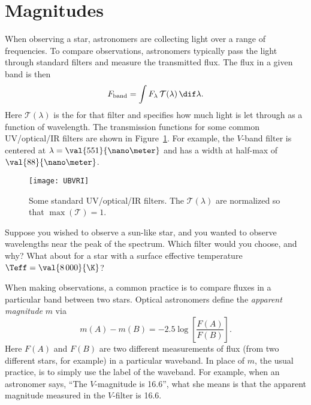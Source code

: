 \section{Magnitudes}
\label{s.magnitudes}

When observing a star, astronomers are collecting light over a range of frequencies. To compare observations, astronomers typically pass the light through standard filters and measure the transmitted flux. The flux in a given band is then
\[
	F_{\mathrm{band}} = \int F_{\lambda} \, \mathcal{T}(\lambda)\,\dif\lambda.
\]
Here $\mathcal{T}(\lambda)$ is the  for that filter and specifies how much light is let through as a function of wavelength.  The transmission functions for some common UV/optical/IR filters are shown in Figure~\ref{f.UBVRI}. For example, the $V$-band filter is centered at $\lambda=\val{551}{\nano\meter}$ and has a width at half-max of $\val{88}{\nano\meter}$. 
\begin{figure}
\texttt{[image: UBVRI]}
\caption[Standard filters]{\label{f.UBVRI} Some standard UV/optical/IR filters. The $\mathcal{T}(\lambda)$ are normalized so that $\max(\mathcal{T})=1$.}
\end{figure}

\begin{exercisebox}
Suppose you wished to observe a sun-like star, and you wanted to observe wavelengths near the peak of the spectrum.  Which filter would you choose, and why?  What about for a star with a surface effective temperature $\Teff = \val{8\,000}{\K}$? 
\end{exercisebox}

When making observations, a common practice is to compare fluxes in a particular band between two stars. Optical astronomers define the \emph{apparent magnitude} $m$ via
\begin{equation}\label{e.apparent-magnitude}
m(A) - m(B) = -2.5\log\left[\frac{F(A)}{F(B)}\right].
\end{equation}
Here $F(A)$ and $F(B)$ are two different measurements of flux (from two different stars, for example) in a particular waveband. In place of $m$, the usual practice, is to simply use the label of the waveband. For example, when an astronomer says, ``The $V$-magnitude is 16.6'', what she means is that the apparent magnitude measured in the $V$-filter is 16.6.

